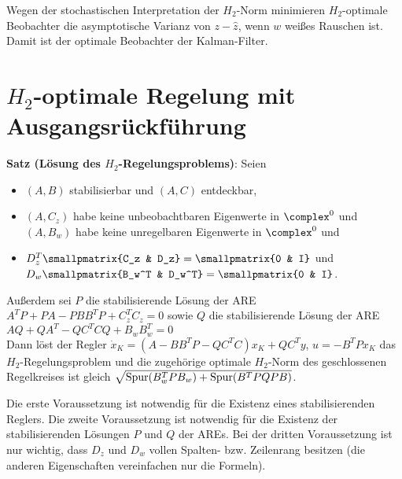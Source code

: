 Wegen der stochastischen Interpretation der $H_2$-Norm minimieren
$H_2$-optimale Beobachter die asymptotische Varianz von $z - \widehat{z}$,
wenn $w$ weißes Rauschen ist.
Damit ist der optimale Beobachter der Kalman-Filter.

\section{%
    \texorpdfstring{$H_2$-optimale}{H₂-optimale} Regelung mit Ausgangsrückführung%
}

\textbf{Satz (Lösung des $H_2$-Regelungsproblems)}:
Seien
\begin{itemize}
    \item
    $(A, B)$ stabilisierbar und $(A, C)$ entdeckbar,

    \item
    $(A, C_z)$ habe keine unbeobachtbaren Eigenwerte in $\complex^0$ und\\
    $(A, B_w)$ habe keine unregelbaren Eigenwerte in $\complex^0$ und

    \item
    $D_z^T \smallpmatrix{C_z & D_z} = \smallpmatrix{0 & I}$ und
    $D_w \smallpmatrix{B_w^T & D_w^T} = \smallpmatrix{0 & I}$.
\end{itemize}
Außerdem sei $P$ die stabilisierende Lösung der ARE $A^T P + PA - PBB^T P + C_z^T C_z = 0$
sowie $Q$ die stabilisierende Lösung der ARE $AQ + QA^T - QC^T CQ + B_w B_w^T = 0$\\
Dann löst der Regler
$\dot{x}_K = (A - BB^T P - QC^T C) x_K + QC^T y$, $u = -B^T P x_K$
das $H_2$-Regelungsproblem und die zugehörige optimale $H_2$-Norm des geschlossenen Regelkreises
ist gleich
$\sqrt{\operatorname{Spur}(B_w^T P B_w) + \operatorname{Spur}(B^T PQPB)}$.

Die erste Voraussetzung ist notwendig für die Existenz eines stabilisierenden Reglers.
Die zweite Voraussetzung ist notwendig für die Existenz der stabilisierenden Lösungen $P$ und $Q$
der AREs.
Bei der dritten Voraussetzung ist nur wichtig, dass $D_z$ und $D_w$ vollen Spalten- bzw.
Zeilenrang besitzen (die anderen Eigenschaften vereinfachen nur die Formeln).

\pagebreak
